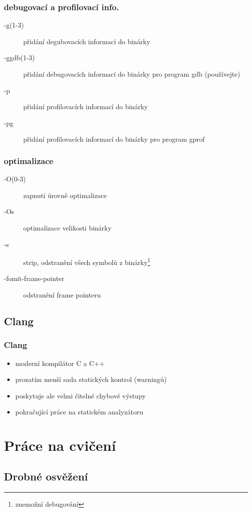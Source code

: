\begin{frame}
	\frametitle{debugovací a profilovací info.}
	\begin{description}
		\item[-g(1-3)]{přidání degubovacích informací do binárky}
		\item[-ggdb(1-3)]{přidání debugovacích informací do binárky pro program gdb (používejte)}
		\item[-p]{přidání profilovacích informací do binárky}
		\item[-pg]{přidání profilovacích informací do binárky pro program gprof}
	\end{description}
\end{frame}

\begin{frame}
	\frametitle{optimalizace}
	\begin{description}
		\item[-O(0-3)]{zapnutí úrovně optimalizace}
		\item[-Os]{optimalizace velikosti binárky}
		\item[-s]{strip, odstranění všech symbolů z binárky\footnote[1]{\alert{znemožní debugování}}}
		\item[-fomit-frame-pointer]{odstranění frame pointeru\footnotemark[1]}
	\end{description}
\end{frame}

\subsection{Clang}

\begin{frame}
	\frametitle{Clang}
	\begin{itemize}
		\item{moderní kompilátor C a C++}
		\item{prozatím menší sada statických kontrol (warningů)}
		\item{poskytuje ale velmi čitelné chybové výstupy}
		\item{pokračující práce na statickém analyzátoru}
	\end{itemize}
\end{frame}

\section{Práce na cvičení}
\subsection{Drobné osvěžení}

